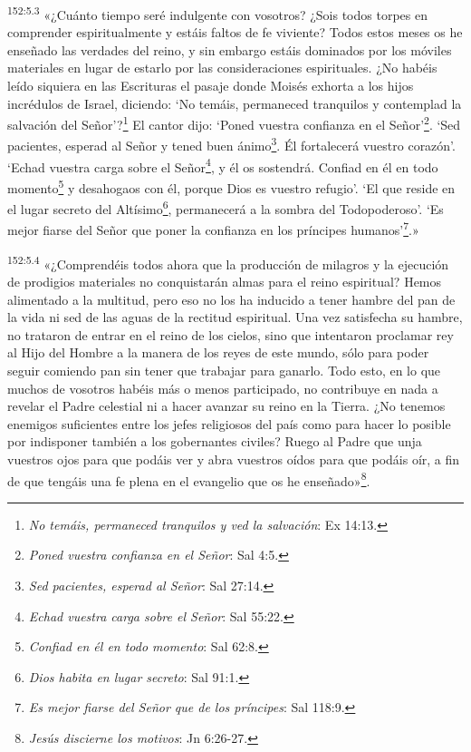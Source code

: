 \par 
\textsuperscript{152:5.3} «¿Cuánto tiempo seré indulgente con vosotros? ¿Sois todos torpes en comprender espiritualmente y estáis faltos de fe viviente? Todos estos meses os he enseñado las verdades del reino, y sin embargo estáis dominados por los móviles materiales en lugar de estarlo por las consideraciones espirituales. ¿No habéis leído siquiera en las Escrituras el pasaje donde Moisés exhorta a los hijos incrédulos de Israel, diciendo: `No temáis, permaneced tranquilos y contemplad la salvación del Señor'?\footnote{\textit{No temáis, permaneced tranquilos y ved la salvación}: Ex 14:13.} El cantor dijo: `Poned vuestra confianza en el Señor'\footnote{\textit{Poned vuestra confianza en el Señor}: Sal 4:5.}. `Sed pacientes, esperad al Señor y tened buen ánimo\footnote{\textit{Sed pacientes, esperad al Señor}: Sal 27:14.}. Él fortalecerá vuestro corazón'. `Echad vuestra carga sobre el Señor\footnote{\textit{Echad vuestra carga sobre el Señor}: Sal 55:22.}, y él os sostendrá. Confiad en él en todo momento\footnote{\textit{Confiad en él en todo momento}: Sal 62:8.} y desahogaos con él, porque Dios es vuestro refugio'. `El que reside en el lugar secreto del Altísimo\footnote{\textit{Dios habita en lugar secreto}: Sal 91:1.}, permanecerá a la sombra del Todopoderoso'. `Es mejor fiarse del Señor que poner la confianza en los príncipes humanos'\footnote{\textit{Es mejor fiarse del Señor que de los príncipes}: Sal 118:9.}.»

\par 
\textsuperscript{152:5.4} «¿Comprendéis todos ahora que la producción de milagros y la ejecución de prodigios materiales no conquistarán almas para el reino espiritual? Hemos alimentado a la multitud, pero eso no los ha inducido a tener hambre del pan de la vida ni sed de las aguas de la rectitud espiritual. Una vez satisfecha su hambre, no trataron de entrar en el reino de los cielos, sino que intentaron proclamar rey al Hijo del Hombre a la manera de los reyes de este mundo, sólo para poder seguir comiendo pan sin tener que trabajar para ganarlo. Todo esto, en lo que muchos de vosotros habéis más o menos participado, no contribuye en nada a revelar el Padre celestial ni a hacer avanzar su reino en la Tierra. ¿No tenemos enemigos suficientes entre los jefes religiosos del país como para hacer lo posible por indisponer también a los gobernantes civiles? Ruego al Padre que unja vuestros ojos para que podáis ver y abra vuestros oídos para que podáis oír, a fin de que tengáis una fe plena en el evangelio que os he enseñado»\footnote{\textit{Jesús discierne los motivos}: Jn 6:26-27.}.

